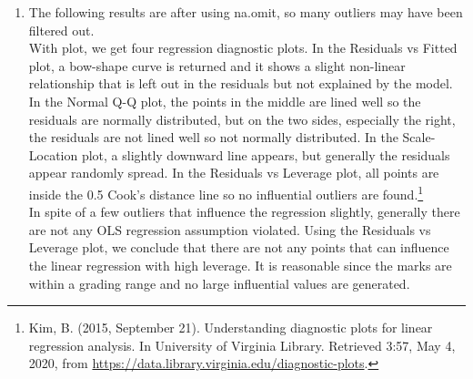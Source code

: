 \documentclass[10pt]{article}
\begin{document}
\begin{enumerate}[1)]
\item
The following results are after using {\ttfamily na.omit}, so many outliers may have been filtered out.\\
With {\ttfamily plot}, we get four regression diagnostic plots. In the Residuals vs Fitted plot, a bow-shape curve is returned and it shows a slight non-linear relationship that is left out in the residuals but not explained by the model. In the Normal Q-Q plot, the points in the middle are lined well so the residuals are normally distributed, but on the two sides, especially the right, the residuals are not lined well so not normally distributed. In the Scale-Location plot, a slightly downward line appears, but generally the residuals appear randomly spread. In the Residuals vs Leverage plot, all points are inside the 0.5 Cook's distance line so no influential outliers are found.\footnote{\;Kim, B. (2015, September 21). Understanding diagnostic plots for linear regression analysis. In University of Virginia Library. Retrieved 3:57, May 4, 2020, from \url{https://data.library.virginia.edu/diagnostic-plots}.}\\
In spite of a few outliers that influence the regression slightly, generally there are not any OLS regression assumption violated. Using the Residuals vs Leverage plot, we conclude that there are not any points that can influence the linear regression with high leverage. It is reasonable since the marks are within a grading range and no large influential values are generated.

\end{enumerate}
\end{document}
